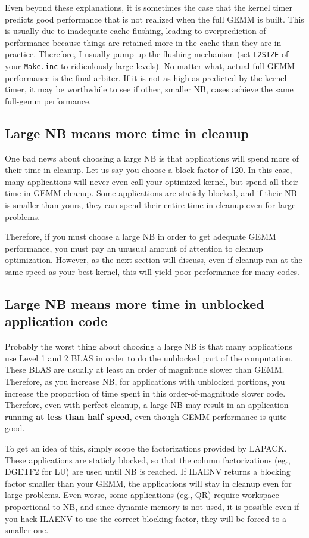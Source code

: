 \documentclass[11pt]{article}
\begin{document}
Even beyond these explanations, it is sometimes the case that the kernel
timer predicts good performance that is not realized when the full GEMM
is built.  This is usually due to inadequate cache flushing, leading
to overprediction of performance because things are retained more in
the cache than they are in practice.  Therefore, I usually pump up the
flushing mechanism (set {\tt L2SIZE} of your {\tt Make.inc} to ridiculously
large levels).  No matter what, actual full GEMM performance is the final
arbiter.  If it is not as high as predicted by the kernel timer, it
may be worthwhile to see if other, smaller NB, cases achieve the same
full-gemm performance.

\subsection{Large NB means more time in cleanup}
One bad news about choosing a large NB is that applications will spend
more of their time in cleanup.  Let us say you choose a block factor of
120.  In this case, many applications will never even call your optimized
kernel, but spend all their time in GEMM cleanup.  Some applications are
staticly blocked, and if their NB is smaller than yours, they can spend
their entire time in cleanup even for large problems.

Therefore, if you must choose a large NB in order to get adequate GEMM
performance, you must pay an unusual amount of attention to cleanup
optimization.  However, as the next section will discuss, even if
cleanup ran at the same speed as your best kernel, this will yield
poor performance for many codes.

\subsection{Large NB means more time in unblocked application code}
Probably the worst thing about choosing a large NB is that many applications
use Level 1 and 2 BLAS in order to do the unblocked part of the
computation.  These BLAS are usually at least an order of magnitude slower
than GEMM.  Therefore, as you increase NB, for applications with unblocked
portions, you increase the proportion of time spent in this order-of-magnitude
slower code.  Therefore, even with perfect cleanup, a large NB may result
in an application running {\bf at less than half speed},
even though GEMM performance is quite good.  

To get an idea of this, simply scope the factorizations provided by LAPACK.
These applications are staticly blocked, so that 
the column factorizations (eg., DGETF2 for LU) are used until NB is reached.
If ILAENV returns a blocking factor smaller than your GEMM, the applications
will stay in cleanup even for large problems.  Even worse, some applications
(eg., QR) require workspace proportional to NB, and since dynamic memory
is not used, it is possible even if you hack ILAENV to use the correct
blocking factor, they will be forced to a smaller one.
\end{document}
